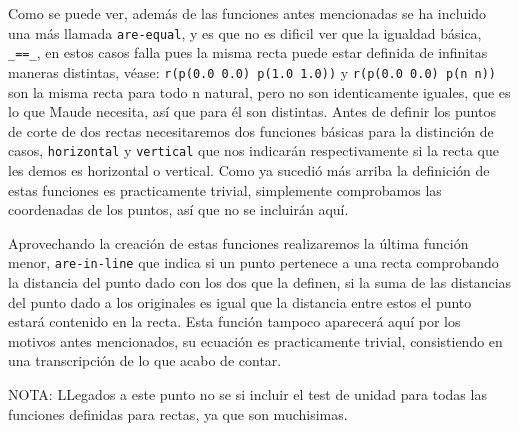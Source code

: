 Como se puede ver, además de las funciones antes mencionadas se ha incluido una más llamada \texttt{are-equal}, y es que no es dificil ver que la igualdad básica, \verb"_==_", en estos casos falla pues la misma recta puede estar definida de infinitas maneras distintas, véase: \texttt{r(p(0.0 0.0) p(1.0 1.0))} y \texttt{r(p(0.0 0.0) p(n n))} son la misma recta para todo n natural, pero no son identicamente iguales, que es lo que Maude necesita, así que para él son distintas. Antes de definir los puntos de corte de dos rectas necesitaremos dos funciones básicas para la distinción de casos, \texttt{horizontal} y \texttt{vertical} que nos indicarán respectivamente si la recta que les demos es horizontal o vertical. Como ya sucedió más arriba la definición de estas funciones es practicamente trivial, simplemente comprobamos las coordenadas de los puntos, así que no se incluirán aquí.\par
Aprovechando la creación de estas funciones realizaremos la última función menor, \texttt{are-in-line} que indica si un punto pertenece a una recta comprobando la distancia del punto dado con los dos que la definen, si la suma de las distancias del punto dado a los originales es igual que la distancia entre estos el punto estará contenido en la recta. Esta función tampoco aparecerá aquí por los motivos antes mencionados, su ecuación es practicamente trivial, consistiendo en una transcripción de lo que acabo de contar.\par

NOTA: LLegados a este punto no se si incluir el test de unidad para todas las funciones definidas para rectas, ya que son muchisimas. \par

